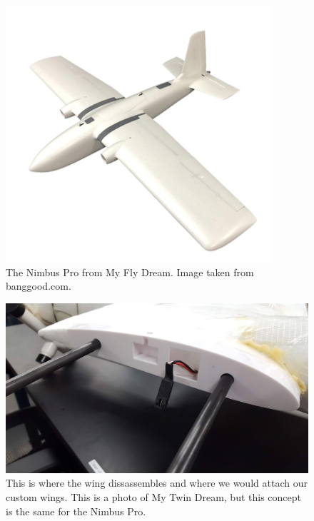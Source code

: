 \documentclass[]{auvsi_doc}
\begin{document}
\begin{figure}[h!]
	\centering
	\includegraphics[scale=0.7]{figs/NimbusPro}
	\caption{The Nimbus Pro from My Fly Dream. Image taken from banggood.com.}
	\label{fig:nimbus}    
\end{figure}

\begin{figure}[h!]
	\centering
	\includegraphics[width=.8\columnwidth]{figs/wing}
	\caption{This is where the wing dissassembles and where we would attach our custom wings. This is a photo of My Twin Dream, but this concept is the same for the Nimbus Pro.}
	\label{fig:wing}    
\end{figure}
\end{document}
